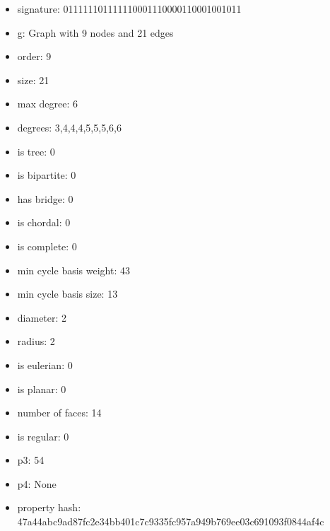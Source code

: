 \newpage
\begin{figure}
\end{figure}
\begin{itemize}
\item signature: 011111101111110001110000110001001011
\item g: Graph with 9 nodes and 21 edges
\item order: 9
\item size: 21
\item max degree: 6
\item degrees: 3,4,4,4,5,5,5,6,6
\item is tree: 0
\item is bipartite: 0
\item has bridge: 0
\item is chordal: 0
\item is complete: 0
\item min cycle basis weight: 43
\item min cycle basis size: 13
\item diameter: 2
\item radius: 2
\item is eulerian: 0
\item is planar: 0
\item number of faces: 14
\item is regular: 0
\item p3: 54
\item p4: None
\item property hash: 47a44abc9ad87fc2e34bb401c7c9335fc957a949b769ee03c691093f0844af4c
\end{itemize}
